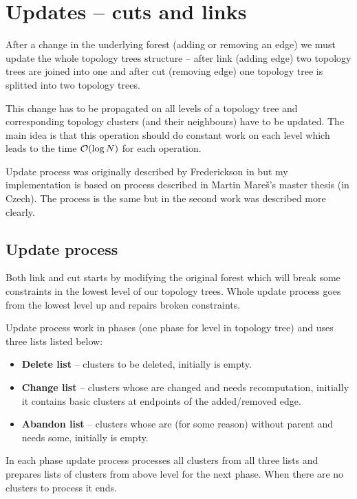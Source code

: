 \section{Updates -- cuts and links}

After a change in the underlying forest (adding or removing an edge) we must
update the whole topology trees structure -- after {\I link} (adding edge) two
topology trees are joined into one and after {\I cut} (removing edge) one
topology tree is splitted into two topology trees.

This change has to be propagated on all levels of a topology tree and
corresponding topology clusters (and their neighbours) have to be updated. The
main idea is that this operation should do constant work on each level which
leads to the time ${\cal O}(\log N)$ for each operation.

Update process was originally described by Frederickson in
\cite{DSforDynamicallyMaintainingRootedTrees} but my implementation is based on
process described in Martin Mareš's master thesis \cite{DGA} (in Czech). The
process is the same but in the second work was described more clearly.

\subsection{Update process}

Both link and cut starts by modifying the original forest which will break some
constraints in the lowest level of our topology trees. Whole update process
goes from the lowest level up and repairs broken constraints.

Update process work in phases (one phase for level in topology tree) and uses
three lists listed below:
\begin{itemize}
\item {\bf Delete list} -- clusters to be deleted, initially is empty.
\item {\bf Change list} -- clusters whose are changed and needs recomputation, initially
it contains basic clusters at endpoints of the added/removed edge.
\item {\bf Abandon list} -- clusters whose are (for some reason) without parent and
needs some, initially is empty.
\end{itemize}

In each phase update process processes all clusters from all three lists and
prepares lists of clusters from above level for the next phase. When there are
no clusters to process it ends.

